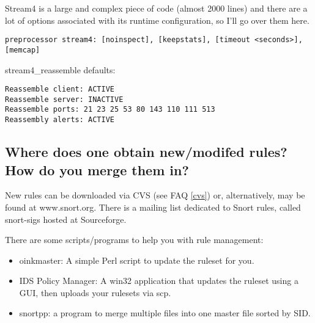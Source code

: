 \documentclass{article}
\newcommand{\myref}[1]{(see FAQ \ref{#1})}
\begin{document}
Stream4 is a large and complex piece of code (almost 2000 lines) and there are a lot of options associated with its runtime configuration, so I'll go over them here.

\begin{verbatim}
preprocessor stream4: [noinspect], [keepstats], [timeout <seconds>], [memcap]
\end{verbatim}

stream4\_reassemble defaults: 
\begin{verbatim}
Reassemble client: ACTIVE 
Reassemble server: INACTIVE 
Reassemble ports: 21 23 25 53 80 143 110 111 513 
Reassembly alerts: ACTIVE 
\end{verbatim}


\subsection{Where does one obtain new/modifed rules? How do you merge them in?}

New rules can be downloaded via CVS \myref{cvs} or, alternatively, may be 
found at www.snort.org. There is a mailing list dedicated to Snort rules, 
called snort-sigs hosted at Sourceforge.

There are some scripts/programs to help you with rule management:
\begin{itemize}
  \item oinkmaster: A simple Perl script to update the ruleset for you.


  \item IDS Policy Manager: A win32 application that updates the ruleset
    using a GUI, then uploads your rulesets via scp.


  \item snortpp: a program to merge multiple files into one master file sorted by
    SID.

\end{itemize}
\end{document}
